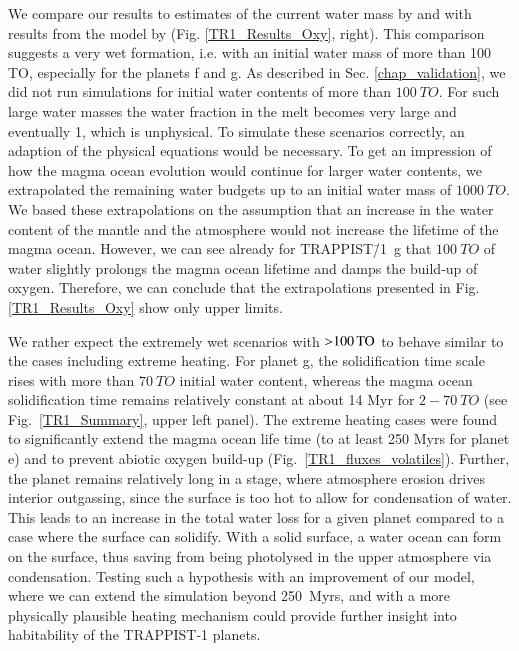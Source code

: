 \documentclass[paper=letterpaper,fontsize=12pt,oneside,twocolumn]{article}
\begin{document}
We compare our results to estimates of the current water mass by \citet{Dorn2018} and with results from the model by \citet{Noack2016} (Fig. \ref{TR1_Results_Oxy}, right).
This comparison suggests a very wet formation, i.e. with an initial water mass of more than 100 TO, especially for the planets f and g. 
As described in Sec. \ref{chap_validation}, we did not run simulations for initial water contents of more than $\SI{100}{TO}$.
For such large water masses the water fraction in the melt becomes very large and eventually 1, which is unphysical. 
To simulate these scenarios correctly, an adaption of the physical equations would be necessary. 
To get an impression of how the magma ocean evolution would continue for larger water contents, we extrapolated the remaining water budgets up to an initial water mass of $\SI{1000}{TO}$.
We based these extrapolations on the assumption that an increase in the water content of the mantle and the atmosphere would not increase the lifetime of the magma ocean.
However, we can see already for TRAPPIST\=/1~g that $\SI{100}{TO}$ of water slightly prolongs the magma ocean lifetime and damps the build-up of oxygen.
Therefore, we can conclude that the extrapolations presented in Fig. \ref{TR1_Results_Oxy} show only upper limits.

We rather expect the extremely wet scenarios with $\SI{>100}{TO}$ to behave similar to the cases including extreme heating. For planet g, the solidification time scale rises with more than $\SI{70}{TO}$ initial water content, whereas the magma ocean solidification time remains relatively constant at about 14 Myr for $2-\SI{70}{TO}$ (see Fig.~\ref{TR1_Summary}, upper left panel). 
The extreme heating cases were found to significantly extend the magma ocean life time (to at least 250 Myrs for planet e) and to prevent abiotic oxygen build-up (Fig.~\ref{TR1_fluxes_volatiles}). Further, the planet remains relatively long in a stage, where atmosphere erosion drives interior outgassing, since the surface is too hot to allow for condensation of water. This leads to an increase in the total water loss for a given planet compared to a case where the surface can solidify. With a solid surface, a water ocean can form on the surface, thus saving  from being photolysed in the upper atmosphere via condensation. Testing such a hypothesis with an improvement of  our model, where we can extend the simulation beyond 250~Myrs, and with a more physically plausible heating mechanism could provide further insight into habitability of the TRAPPIST-1 planets.
\end{document}
